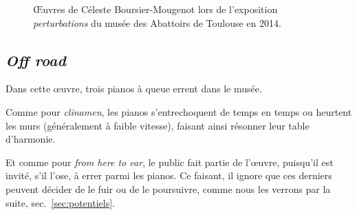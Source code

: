 \documentclass[french,A4paper,]{book}
\begin{document}
\begin{figure}
\hspace*{\fill}
\hfill%
\hspace*{\fill}

\caption{Œuvres de Céleste Boursier-Mougenot lors de l'exposition
\emph{perturbations} du musée des Abattoirs de Toulouse en 2014.}

\label{fig:perturbations}

\end{figure}

\subsection{\texorpdfstring{\emph{Off road}}{Off road}}\label{off-road}

Dans cette œuvre, trois pianos à queue errent dans le musée.

Comme pour \emph{clinamen}, les pianos s'entrechoquent de temps en temps
ou heurtent les murs (généralement à faible vitesse), faisant ainsi
résonner leur table d'harmonie.

Et comme pour \emph{from here to ear}, le public fait partie de l'œuvre,
puisqu'il est invité, s'il l'ose, à errer parmi les pianos. Ce faisant,
il ignore que ces derniers peuvent décider de le fuir ou de le
poursuivre, comme nous les verrons par la suite,
sec.~\ref{sec:potentiels}.
\end{document}
